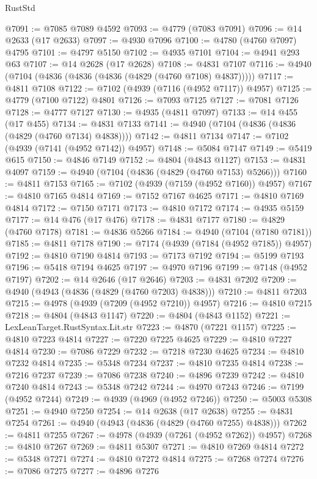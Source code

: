 \begin{lexlean}{RustStd}
\begin{coremodule}
@7091 := @7085 @7089 @4592
@7093 := @4779 (@7083 @7091)
@7096 := @14 @2633 (@17 @2633)
@7097 := @4930 @7096
@7100 := @4780 (@4760 @7097) @4795
@7101 := @4797 @5150
@7102 := @4935 @7101
@7104 := @4941 @293 @63
@7107 := @14 @2628 (@17 @2628)
@7108 := @4831 @7107
@7116 := @4940 (@7104 (@4836 (@4836 (@4836 (@4829 (@4760 @7108) @4837)))))
@7117 := @4811 @7108
@7122 := @7102 (@4939 (@7116 (@4952 @7117)) @4957)
@7125 := @4779 (@7100 @7122) @4801
@7126 := @7093 @7125
@7127 := @7081 @7126
@7128 := @4777 @7127
@7130 := @4935 (@4811 @7097)
@7133 := @14 @455 (@17 @455)
@7134 := @4831 @7133
@7141 := @4940 (@7104 (@4836 (@4836 (@4829 (@4760 @7134) @4838))))
@7142 := @4811 @7134
@7147 := @7102 (@4939 (@7141 (@4952 @7142)) @4957)
@7148 := @5084 @7147
@7149 := @5419 @615
@7150 := @4846 @7149
@7152 := @4804 (@4843 @1127)
@7153 := @4831 @4097
@7159 := @4940 (@7104 (@4836 (@4829 (@4760 @7153) @5266)))
@7160 := @4811 @7153
@7165 := @7102 (@4939 (@7159 (@4952 @7160)) @4957)
@7167 := @4810 @7165 @4814
@7169 := @7152 @7167 @4625
@7171 := @4810 @7169 @4814
@7172 := @7150 @7171
@7173 := @4810 @7172
@7174 := @4935 @5159
@7177 := @14 @476 (@17 @476)
@7178 := @4831 @7177
@7180 := @4829 (@4760 @7178)
@7181 := @4836 @5266
@7184 := @4940 (@7104 (@7180 @7181))
@7185 := @4811 @7178
@7190 := @7174 (@4939 (@7184 (@4952 @7185)) @4957)
@7192 := @4810 @7190 @4814
@7193 := @7173 @7192
@7194 := @5199 @7193
@7196 := @5418 @7194 @4625
@7197 := @4970 @7196
@7199 := @7148 (@4952 @7197)
@7202 := @14 @2646 (@17 @2646)
@7203 := @4831 @7202
@7209 := @4940 (@4943 (@4836 (@4829 (@4760 @7203) @4838)))
@7210 := @4811 @7203
@7215 := @4978 (@4939 (@7209 (@4952 @7210)) @4957)
@7216 := @4810 @7215
@7218 := @4804 (@4843 @1147)
@7220 := @4804 (@4843 @1152)
@7221 := LexLeanTarget.RustSyntax.Lit.str
@7223 := @4870 (@7221 @1157)
@7225 := @4810 @7223 @4814
@7227 := @7220 @7225 @4625
@7229 := @4810 @7227 @4814
@7230 := @7086 @7229
@7232 := @7218 @7230 @4625
@7234 := @4810 @7232 @4814
@7235 := @5348 @7234
@7237 := @4810 @7235 @4814
@7238 := @7216 @7237
@7239 := @7086 @7238
@7240 := @4896 @7239
@7242 := @4810 @7240 @4814
@7243 := @5348 @7242
@7244 := @4970 @7243
@7246 := @7199 (@4952 @7244)
@7249 := @4939 (@4969 (@4952 @7246))
@7250 := @5003 @5308
@7251 := @4940 @7250
@7254 := @14 @2638 (@17 @2638)
@7255 := @4831 @7254
@7261 := @4940 (@4943 (@4836 (@4829 (@4760 @7255) @4838)))
@7262 := @4811 @7255
@7267 := @4978 (@4939 (@7261 (@4952 @7262)) @4957)
@7268 := @4810 @7267
@7269 := @4811 @5307
@7271 := @4810 @7269 @4814
@7272 := @5348 @7271
@7274 := @4810 @7272 @4814
@7275 := @7268 @7274
@7276 := @7086 @7275
@7277 := @4896 @7276

\end{coremodule}
\end{lexlean}
